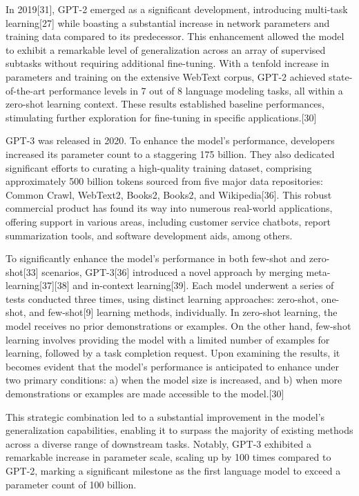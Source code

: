 \documentclass[conference]{IEEEtran}
\begin{document}
In 2019[31], GPT-2 emerged as a significant development, introducing multi-task learning[27] while boasting a substantial increase in network parameters and training data compared to its predecessor. This enhancement allowed the model to exhibit a remarkable level of generalization across an array of supervised subtasks without requiring additional fine-tuning. With a tenfold increase in parameters and training on the extensive WebText corpus, GPT-2 achieved state-of-the-art performance levels in 7 out of 8 language modeling tasks, all within a zero-shot learning context. These results established baseline performances, stimulating further exploration for fine-tuning in specific applications.[30]

GPT-3 was released in 2020. To enhance the model's performance, developers increased its parameter count to a staggering 175 billion. They also dedicated significant efforts to curating a high-quality training dataset, comprising approximately 500 billion tokens sourced from five major data repositories: Common Crawl, WebText2, Books2, Books2, and Wikipedia[36]. This robust commercial product has found its way into numerous real-world applications, offering support in various areas, including customer service chatbots, report summarization tools, and software development aids, among others.

To significantly enhance the model's performance in both few-shot and zero-shot[33] scenarios, GPT-3[36] introduced a novel approach by merging meta-learning[37][38] and in-context learning[39]. Each model underwent a series of tests conducted three times, using distinct learning approaches: zero-shot, one-shot, and few-shot[9] learning methods, individually. In zero-shot learning, the model receives no prior demonstrations or examples. On the other hand, few-shot learning involves providing the model with a limited number of examples for learning, followed by a task completion request. Upon examining the results, it becomes evident that the model's performance is anticipated to enhance under two primary conditions: a) when the model size is increased, and b) when more demonstrations or examples are made accessible to the model.[30]

This strategic combination led to a substantial improvement in the model's generalization capabilities, enabling it to surpass the majority of existing methods across a diverse range of downstream tasks. Notably, GPT-3 exhibited a remarkable increase in parameter scale, scaling up by 100 times compared to GPT-2, marking a significant milestone as the first language model to exceed a parameter count of 100 billion.
\end{document}
